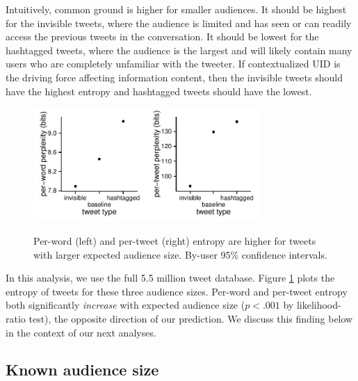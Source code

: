 \documentclass[11pt,letterpaper]{article}
\begin{document}
Intuitively, common ground is higher for smaller audiences. It should be highest for the invisible tweets, where the audience is limited and has seen or can readily access the previous tweets in the conversation.  It should be lowest for the hashtagged tweets, where the audience is the largest and will likely contain many users who are completely unfamiliar with the tweeter.  If contextualized UID is the driving force affecting information content, then the invisible tweets should have the highest entropy and hashtagged tweets should have the lowest.

\begin{figure}
 \centering \includegraphics[width=1.7in]{figures/cmcl-audience-pw.pdf}\includegraphics[width=1.7in]{figures/cmcl-audience-pt.pdf}
 \caption{\label{fig:audience} Per-word (left) and per-tweet (right) entropy are higher for tweets with larger expected audience size. By-user 95\% confidence intervals.}
\vspace*{-.5em}
\end{figure}

In this analysis, we use the full 5.5 million tweet database. Figure \ref{fig:audience} plots the entropy of tweets for these three audience sizes.  Per-word and per-tweet entropy both significantly {\it increase} with expected audience size ($p < .001$ by likelihood-ratio test), the opposite direction of our prediction. We discuss this finding below in the context of our next analyses. 


\subsection{Known audience size}
\end{document}
